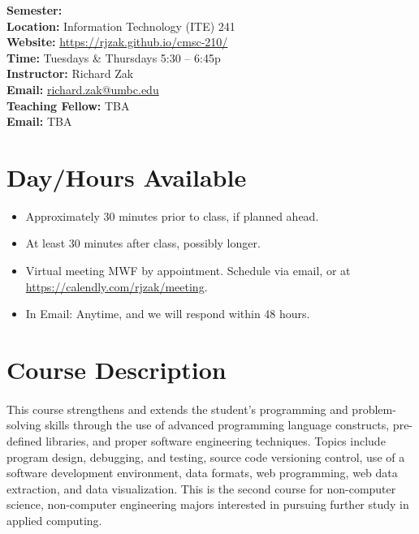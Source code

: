 \documentclass[letter,11pt]{article}
\begin{document}
\textbf{Semester:} \\
\textbf{Location:} Information Technology (ITE) 241 \\
\textbf{Website:} \url{https://rjzak.github.io/cmsc-210/} \\
\textbf{Time:} Tuesdays \& Thursdays 5:30 -- 6:45p \\
\textbf{Instructor:} Richard Zak \\
\textbf{Email:} \href{mailto:richard.zak@umbc.edu?Subject=CMSC104}{richard.zak@umbc.edu} \\
\textbf{Teaching Fellow:} TBA \\
\textbf{Email:} TBA

\section*{Day/Hours Available}
\begin{itemize}
\item Approximately 30 minutes prior to class, if planned ahead.
\item At least 30 minutes after class, possibly longer.
\item Virtual meeting MWF by appointment. Schedule via email, or at \url{https://calendly.com/rjzak/meeting}.
\item In Email: Anytime, and we will respond within 48 hours.
\end{itemize}


\section*{Course Description}
\paragraph{}This course strengthens and extends the student's programming and problem-solving skills through the use of advanced programming language constructs, pre-defined libraries, and proper software engineering techniques. Topics include program design, debugging, and testing, source code versioning control, use of a software development environment, data formats, web programming, web data extraction, and data visualization. This is the second course for non-computer science, non-computer engineering majors interested in pursuing further study in applied computing.
\end{document}
